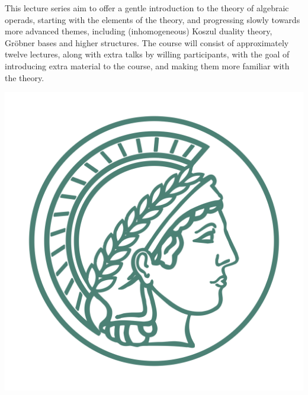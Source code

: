 \documentclass[fleqn, a4paper, twoside]{article}
\title{\vspace{-5 em}\setstretch{0.85}{\textbf{Algebraic operads, Koszul duality and Gr\"obner bases: an introduction}}}
\author{P. Tamaroff}
\date{August 22 and 24}
\newcommand{\0}{\langle 0\rangle}
\DeclareRobustCommand{\[}{\begin{equation}}%
\DeclareRobustCommand{\]}{\end{equation}}%
\theoremstyle{mytheorem}
\theoremstyle{introthm}
\theoremstyle{mydefinition}
\theoremstyle{mydefinition2}
\theoremstyle{plain} %
\newcommand{\?}{\,?\,}
\theoremstyle{mytheorem}
\theoremstyle{plain} %
\renewenvironment{abstract}{%
\small\begin{center}
\begin{minipage}{.9\textwidth}
}
{\par\noindent\end{minipage}\end{center}\vspace{3 em}}
\begin{document}
\maketitle


\thispagestyle{empty}

\begin{abstract}
This lecture series aim to offer a gentle introduction
to the theory of algebraic operads, starting with the
elements of the theory, and progressing slowly towards
more advanced themes, including (inhomogeneous)
Koszul duality theory, Gr\"obner bases and higher
structures. The course will consist of approximately
twelve lectures, along with extra talks by
willing participants, with the goal of introducing extra
material to the course, and making them more
familiar with the theory.
\end{abstract}

\vspace{2 cm}

\begin{center}
\includegraphics[scale=.05]{logoMPG.png}
\end{center}
\end{document}
